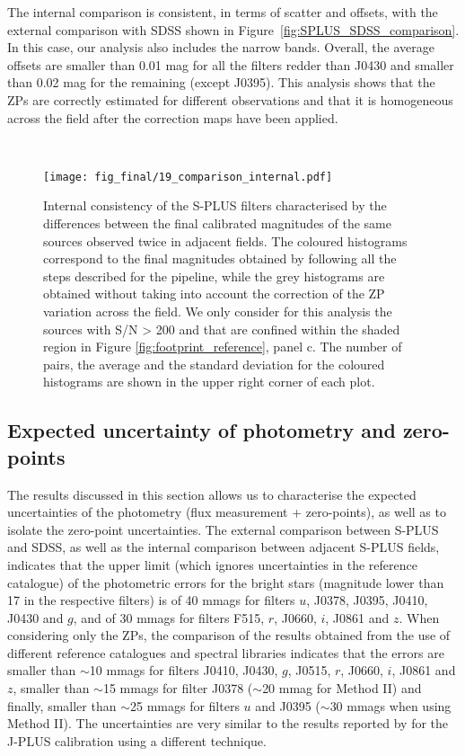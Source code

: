 \documentclass[fleqn,usenatbib]{mnras}
\begin{document}
The internal comparison is consistent, in terms of scatter and offsets, with the external comparison with SDSS shown in Figure~\ref{fig:SPLUS_SDSS_comparison}. In this case, our analysis also includes the narrow bands. Overall, the average offsets are smaller than 0.01 mag for all the filters redder than J0430 and smaller than 0.02 mag for the remaining (except J0395). This analysis shows that the ZPs are correctly estimated for different observations and that it is homogeneous across the field after the correction maps have been applied.

\begin{figure}\textcolor{white}{[h!]}
\begin{center}
\texttt{[image: fig\_final/19\_comparison\_internal.pdf]}
\caption{\label{fig:hist_overlapping_fields} Internal consistency of the S-PLUS filters characterised by the differences between the final calibrated magnitudes of the same sources observed twice in adjacent fields. The coloured histograms correspond to the final magnitudes obtained by following all the steps described for the pipeline, while the grey histograms are obtained without taking into account the correction of the ZP variation across the field. We only consider for this analysis the sources with S/N > 200 and that are confined within the shaded region in Figure \ref{fig:footprint_reference}, panel c. The number of pairs, the average and the standard deviation for the coloured histograms are shown in the upper right corner of each plot.}
\end{center}
\end{figure}


\subsection{Expected uncertainty of photometry and zero-points}

The results discussed in this section allows us to characterise the expected uncertainties of the photometry (flux measurement + zero-points), as well as to isolate the zero-point uncertainties. The external comparison between S-PLUS and SDSS, as well as the internal comparison between adjacent S-PLUS fields, indicates that the upper limit (which ignores uncertainties in the reference catalogue) of the photometric errors for the bright stars (magnitude lower than 17 in the respective filters) is of 40 mmags for filters $u$, J0378, J0395, J0410, J0430 and $g$, and of 30 mmags for filters F515, $r$, J0660, $i$, J0861 and $z$. When considering only the ZPs, the comparison of the results obtained from the use of different reference catalogues and spectral libraries indicates that the errors are smaller than $\sim$10 mmags for filters J0410, J0430, $g$, J0515, $r$, J0660, $i$, J0861 and $z$, smaller than $\sim$15 mmags for filter J0378 ($\sim$20 mmag for Method II) and finally, smaller than $\sim$25 mmags for filters $u$ and J0395 ($\sim$30 mmags when using Method II).  The uncertainties are very similar to the results reported by  for the J-PLUS calibration using a different technique.
\end{document}
